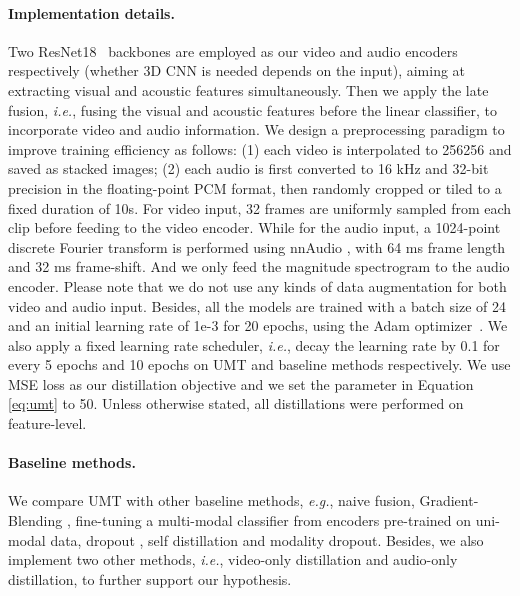 \paragraph{Implementation details.} Two ResNet18~\cite{he2016deep} backbones are employed as our video and audio encoders respectively (whether 3D CNN is needed depends on the input), aiming at extracting visual and acoustic features simultaneously. Then we apply the late fusion, \textit{i.e.}, fusing the visual and acoustic features before the linear classifier, to incorporate video and audio information. We design a preprocessing paradigm to improve training efficiency as follows: (1) each video is interpolated to 256256 and saved as stacked images; (2) each audio is first converted to 16 kHz and 32-bit precision in the floating-point PCM format, then randomly cropped or tiled to a fixed duration of 10s. For video input, 32 frames are uniformly sampled from each clip before feeding to the video encoder. While for the audio input, a 1024-point discrete Fourier transform is performed using nnAudio \cite{cheuk2020nnaudio}, with 64 ms frame length and 32 ms frame-shift. And we only feed the magnitude spectrogram to the audio encoder. Please note that we do not use any kinds of data augmentation for both video and audio input. Besides, all the models are trained with a batch size of 24 and an initial learning rate of 1e-3 for 20 epochs, using the Adam optimizer~\cite{kingma2014adam}. We also apply a fixed learning rate scheduler, \textit{i.e.}, decay the learning rate by 0.1 for every 5 epochs and 10 epochs on UMT and baseline methods respectively. We use MSE loss as our distillation objective and we set the  parameter in Equation \eqref{eq:umt} to 50. Unless otherwise stated, all distillations were performed on feature-level.  





\paragraph{Baseline methods.} 
We compare UMT with other baseline methods, \textit{e.g.}, naive fusion, Gradient-Blending \cite{wang2020makes}, fine-tuning a multi-modal classifier from encoders pre-trained on uni-modal data, dropout \cite{srivastava2014dropout}, self distillation \cite{zhang2019your} and modality dropout. Besides, we also implement two other methods, \textit{i.e.}, video-only distillation and audio-only distillation, to further support our hypothesis. 

